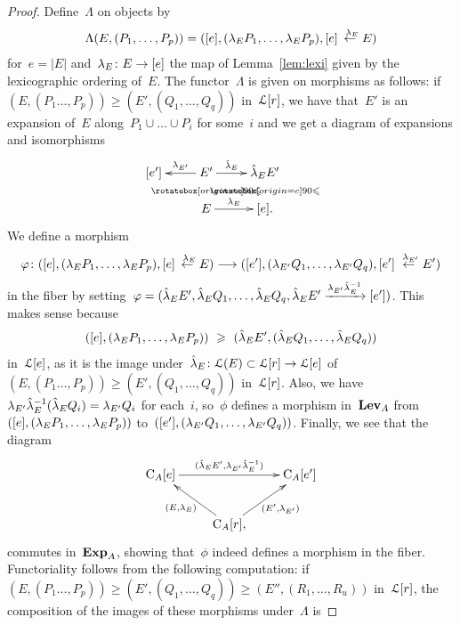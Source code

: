 \begin{proof}
Define~$\Lambda$ on objects by 
\begin{gather*}
\Lambda(E,(P_1,\dots,P_p))=([e],(\lambda_E P_1,\dots,\lambda_EP_p),[e]\stackrel{\ \lambda_E}{\leftarrow} E)
\end{gather*}
for~$e=|E|$ and~$\lambda_E\colon E\to [e]$ the map of Lemma~\ref{lem:lexi} given by the lexicographic ordering of~$E$. 
The functor~$\Lambda$ is given on morphisms as follows: if~$(E,(P_1\dots,P_p))\ge (E',(Q_1,\dots,Q_q))$ in~$\mathcal{L}[r]$, we have that~$E'$ is an expansion of~$E$ along~$P_1\cup \dots\cup P_i$ for some~$i$ and 
we get a diagram of expansions and isomorphisms 
$$\xymatrix@R-1pc{[e'] & \ar[l]_-{\la_{E'}} E' \ar@{}[d]|{\IV} \ar[r]^-{\hat\la_E} & \hat\la_EE' \ar@{}[d]|{\IV}\\
& E \ar[r]^-{\la_E} & [e].
}$$
We define a morphism 
$$\varphi\colon([e],(\lambda_EP_1,\dots,\lambda_EP_p),[e]\stackrel{\ \lambda_E}{\leftarrow} E) \longrightarrow ([e'],(\lambda_{E'}Q_1,\dots,\lambda_{E'}Q_q),[e']\stackrel{\ \lambda_{E'}}{\leftarrow} E')$$
in the fiber by setting~$\varphi=(\hat{\lambda}_EE',\hat{\lambda}_E Q_1,\dots,\hat{\lambda}_EQ_q,\hat{\lambda}_EE'\xrightarrow{\lambda_{E'}\hat{\lambda}_E^{-1}} [e'])$. 
This makes sense because 
$$([e],(\lambda_EP_1,\dots,\lambda_EP_p))\ \geqslant \ (\hat{\lambda}_EE',(\hat{\lambda}_E Q_1,\dots,\hat{\lambda}_EQ_q))$$
in~$\mathcal{L}[e]$, as it is 
the image under~$\hat {\lambda}_E\colon \mathcal{L}(E)\subset \mathcal{L}[r]\to \mathcal{L}[e]$ of~$(E,(P_1\dots,P_p))\geqslant(E',(Q_1,\dots,Q_q))$ in~$\mathcal{L}[r]$. 
Also, we have~$\lambda_{E'}\hat{\lambda}_E^{-1}(\hat{\lambda}_EQ_i)=\lambda_{E'}Q_i$ for each~$i$, so~$\phi$ defines a morphism in~$\mathbf{Lev}_A$ from~$([e],(\lambda_EP_1,\dots,\lambda_EP_p))$ to~$([e'],(\lambda_{E'}Q_1,\dots,\lambda_{E'}Q_q))$.  
Finally, we see that the diagram 
$$\xymatrix{\rmC_A[e] \ar[rr]^-{(\hat\la_EE',\la_{E'}\hat\la_E^{-1})} && \rmC_A[e']\\
&\rmC_A[r], \ar[ul]^{(E,\la_E)}\ar[ur]_{(E',\la_{E'})}&
}$$
commutes in~$\mathbf{Exp}_A$, 
showing that~$\phi$ indeed defines a morphism in the fiber. Functoriality follows from the following computation: 
if~$(E,(P_1\dots,P_p))\ge (E',(Q_1,\dots,Q_q))\ge (E'',(R_1,\dots,R_u))$ in~$\mathcal{L}[r]$, the composition of the images of these morphisms under~$\Lambda$ is 

\end{proof}
